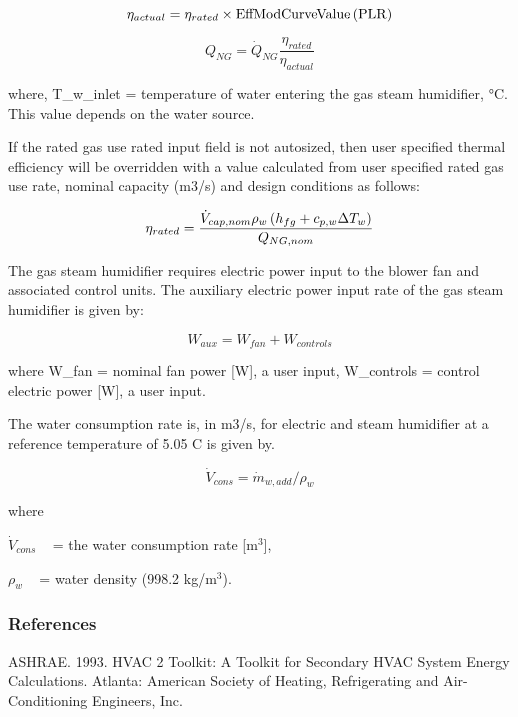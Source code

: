 \begin{equation}
\eta_{actual} = \eta_{rated} \times \rm{EffModCurveValue}\left(PLR\right)
\end{equation}

\begin{equation}
Q_{NG} = \dot{Q}_{NG}\frac{\eta_{rated}}{\eta_{actual}}
\end{equation}

where, T\_w\_inlet = temperature of water entering the gas steam humidifier, °C. This value depends on the water source.

If the rated gas use rated input field is not autosized, then user specified thermal efficiency will be overridden with a value calculated from user specified rated gas use rate, nominal capacity (m3/s) and design conditions as follows:

\begin{equation}
 \eta_{rated} = \frac{\dot{V}_{cap,nom} \rho_w \left(h_{fg}+c_{p,w}\Delta T_w\right)}{Q_{NG,nom}}
\end{equation}

The gas steam humidifier requires electric power input to the blower fan and associated control units. The auxiliary electric power input rate of the gas steam humidifier is given by:

\begin{equation}
W_{aux} = W_{fan} + W_{controls}
\end{equation}

where W\_fan = nominal fan power {[}W{]}, a user input, W\_controls = control electric power {[}W{]}, a user input.

The water consumption rate is, in m3/s, for electric and steam humidifier at a reference temperature of 5.05 C is given by.

\begin{equation}
{\dot V_{cons}} = {\dot m_{w,add}}/{\rho_w}
\end{equation}

where

\({\dot V_{cons}}\) ~ = the water consumption rate {[}m\(^{3}\){]},

\({\rho_w}\) ~ = water density (998.2 kg/m\(^{3}\)).

\subsubsection{References}\label{references-003}

ASHRAE. 1993. HVAC 2 Toolkit: A Toolkit for Secondary HVAC System Energy Calculations. Atlanta: American Society of Heating, Refrigerating and Air-Conditioning Engineers, Inc.

